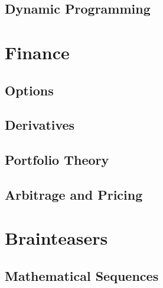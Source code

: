 \documentclass{article}
\begin{document}
\subsection{Dynamic Programming}

\newpage
\section{Finance}

\subsection{Options}

\subsection{Derivatives}

\subsection{Portfolio Theory}

\subsection{Arbitrage and Pricing}

\newpage
\section{Brainteasers}

\subsection{Mathematical Sequences}
\end{document}

